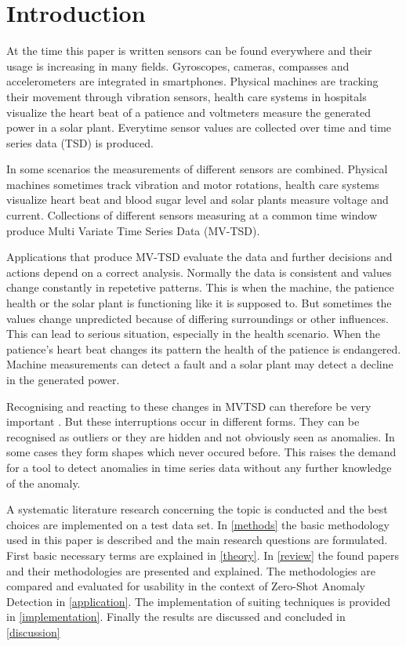\section{Introduction}\label{intro}
At the time this paper is written sensors can be found everywhere and their usage is increasing in many fields. Gyroscopes, cameras, compasses and accelerometers are integrated in smartphones. Physical machines are tracking their movement through vibration sensors, health care systems in hospitals visualize the heart beat of a patience and voltmeters measure the generated power in a solar plant. Everytime sensor values are collected over time and time series data (TSD) is produced.

In some scenarios the measurements of different sensors are combined. Physical machines sometimes track vibration and motor rotations, health care systems visualize heart beat and blood sugar level and solar plants measure voltage and current.
Collections of different sensors measuring at a common time window produce Multi Variate Time Series Data (MV-TSD).

Applications that produce MV-TSD evaluate the data and further decisions and actions depend on a correct analysis.
Normally the data is consistent and values change constantly in repetetive patterns. This is when the machine, the patience health or the solar plant is functioning like it is supposed to. But sometimes the values change unpredicted because of differing surroundings or other influences. This can lead to serious situation, especially in the health scenario. When the patience's heart beat changes its pattern the health of the patience is endangered. Machine measurements can detect a fault and a solar plant may detect a decline in the generated power.

Recognising and reacting to these changes in MVTSD can therefore be very important%
. But these interruptions occur in different forms. They can be recognised as outliers or they are hidden and not obviously seen as anomalies. In some cases they form shapes which never occured before. This raises the demand for a tool to detect anomalies in time series data without any further knowledge of the anomaly.


A systematic literature research concerning the topic is conducted and the best choices are implemented on a test data set. In \ref{methods} the basic methodology used in this paper is described and the main research questions are formulated. First basic necessary terms are explained in \ref{theory}. In \ref{review} the found papers and their methodologies are presented and explained. The methodologies are compared and evaluated for usability in the context of Zero-Shot Anomaly Detection in \ref{application}. The implementation of suiting techniques is provided in \ref{implementation}. Finally the results are discussed and concluded in \ref{discussion}
